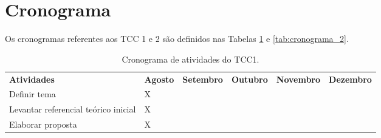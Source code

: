 \section{Cronograma}

Os cronogramas referentes aos TCC 1 e 2 são definidos nas Tabelas \ref{tab:cronograma_1} e \ref{tab:cronograma_2}.

\begin{table}[h]
 \centering \tiny 
 
 {\renewcommand\arraystretch{1.25}
 \caption{Cronograma de atividades do TCC1.}
 \label{tab:cronograma_1}
 \begin{tabular}{ l l l l l l }
  \cline{1-1}\cline{2-2}\cline{3-3}\cline{4-4}\cline{5-5}\cline{6-6}  
    \multicolumn{1}{p{4.750cm}|}{\textbf{Atividades} \centering } &
    \multicolumn{1}{p{1.383cm}|}{\textbf{Agosto} \centering } &
    \multicolumn{1}{p{1.383cm}|}{\textbf{Setembro} \centering } &
    \multicolumn{1}{p{1.400cm}|}{\textbf{Outubro} \centering } &
    \multicolumn{1}{p{1.417cm}|}{\textbf{Novembro} \centering } &
    \multicolumn{1}{p{1.400cm}}{\textbf{Dezembro} \centering }
  \\  
  \cline{1-1}\cline{2-2}\cline{3-3}\cline{4-4}\cline{5-5}\cline{6-6}  
    \multicolumn{1}{p{4.750cm}|}{Definir tema \centering } &
    \multicolumn{1}{p{1.383cm}|}{X \centering } &
    \multicolumn{1}{p{1.383cm}|}{  \centering } &
    \multicolumn{1}{p{1.400cm}|}{  \centering } &
    \multicolumn{1}{p{1.417cm}|}{  \centering } &
    \multicolumn{1}{p{1.400cm}}{  \centering }
  \\  
    \multicolumn{1}{p{4.750cm}|}{Levantar referencial teórico inicial \centering } &
    \multicolumn{1}{p{1.383cm}|}{X \centering } &
    \multicolumn{1}{p{1.383cm}|}{  \centering } &
    \multicolumn{1}{p{1.400cm}|}{  \centering } &
    \multicolumn{1}{p{1.417cm}|}{  \centering } &
    \multicolumn{1}{p{1.400cm}}{  \centering }
  \\  
    \multicolumn{1}{p{4.750cm}|}{Elaborar proposta \centering } &
    \multicolumn{1}{p{1.383cm}|}{X \centering } &
    \multicolumn{1}{p{1.383cm}|}{  \centering } &
    \multicolumn{1}{p{1.400cm}|}{  \centering } &
    \multicolumn{1}{p{1.417cm}|}{  \centering } &
    \multicolumn{1}{p{1.400cm}}{  \centering }
  \\  

\end{tabular}}
\end{table}
